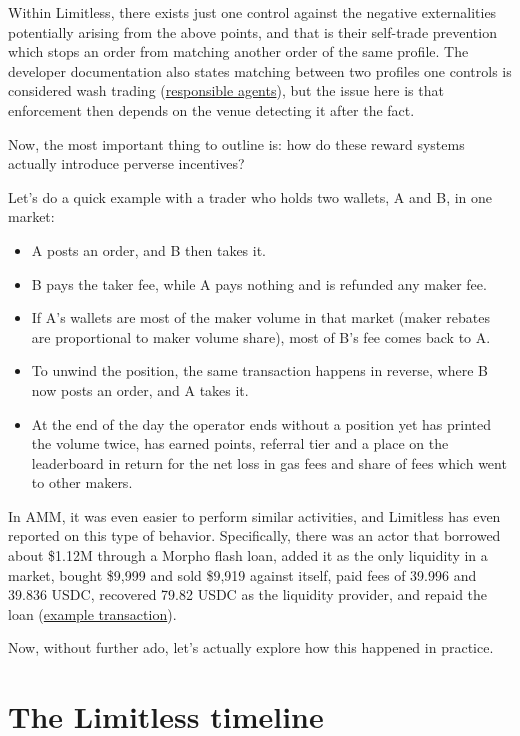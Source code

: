 \documentclass[11pt]{article}
\begin{document}
Within Limitless, there exists just one control against the negative externalities potentially arising from the above points, and that is their self-trade prevention which stops an order from matching another order of the same profile.
The developer documentation also states matching between two profiles one controls is considered wash trading (\href{https://docs.limitless.exchange/developers/responsible-agents}{responsible agents}), but the issue here is that enforcement then depends on the venue detecting it after the fact.

Now, the most important thing to outline is: how do these reward systems actually introduce perverse incentives?

Let's do a quick example with a trader who holds two wallets, A and B, in one market:

\begin{itemize}
\item A posts an order, and B then takes it.
\item B pays the taker fee, while A pays nothing and is refunded any maker fee.
\item If A's wallets are most of the maker volume in that market (maker rebates are proportional to maker volume share), most of B's fee comes back to A.
\item To unwind the position, the same transaction happens in reverse, where B now posts an order, and A takes it.
\item At the end of the day the operator ends without a position yet has printed the volume twice, has earned points, referral tier and a place on the leaderboard in return for the net loss in gas fees and share of fees which went to other makers.
\end{itemize}

In AMM, it was even easier to perform similar activities, and Limitless has even reported on this type of behavior.
Specifically, there was an actor that borrowed about \$1.12M through a Morpho flash loan, added it as the only liquidity in a market, bought \$9,999 and sold \$9,919 against itself, paid fees of 39.996 and 39.836 USDC, recovered 79.82 USDC as the liquidity provider, and repaid the loan (\href{https://basescan.org/tx/0xe19542e6b7f50638eea02c43eca08f888f0e3b8848f55af727f92243caed443c}{example transaction}).

Now, without further ado, let's actually explore how this happened in practice.

\section{The Limitless timeline}
\end{document}
